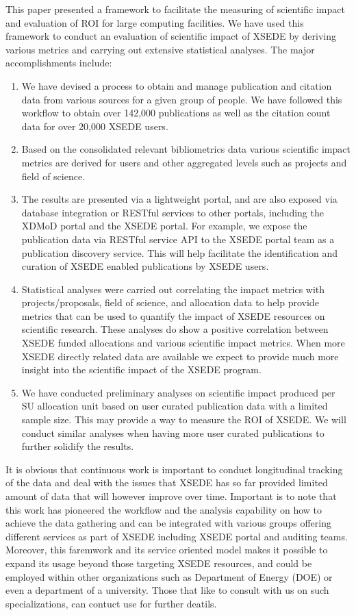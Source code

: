 \documentclass{sig-alternate}
\begin{document}
This paper presented a framework to facilitate the measuring of scientific impact and evaluation of ROI for large computing facilities. We have used this framework to conduct an evaluation of scientific impact of XSEDE by deriving various metrics and carrying out extensive statistical analyses. The major accomplishments include:
\begin{enumerate}
\item We have devised a process to obtain and manage publication and citation data from various sources for a given group of people. We have followed this workflow to obtain over 142,000 publications as well as the citation count data for over 20,000 XSEDE users.
\item Based on the consolidated relevant bibliometrics data various scientific impact metrics are derived for users and other aggregated levels such as projects and field of science.
\item The results are presented via a lightweight portal, and are also exposed via database integration or RESTful services to other portals, including the XDMoD portal and the XSEDE portal. For example, we expose the publication data via RESTful service API to the XSEDE portal team as a publication discovery service. This will help facilitate the identification and curation of XSEDE enabled publications by XSEDE users.
\item Statistical analyses were carried out correlating the impact metrics with projects/proposals, field of science, and allocation data to help provide metrics that can be used to quantify the impact of XSEDE resources on scientific research. These analyses do show a positive correlation between XSEDE funded allocations and various scientific impact metrics. When more XSEDE directly related data are available we expect to provide much more insight into the scientific impact of the XSEDE program.
\item We have conducted preliminary analyses on scientific impact produced per SU allocation unit based on user curated publication data with a limited sample size. This may provide a way to measure the ROI of XSEDE. We will conduct similar analyses when having more user curated publications to further solidify the results.

\end{enumerate} 

It is obvious that continuous work is important to conduct longitudinal tracking of the data and deal with the issues that XSEDE has so far provided limited amount of data that will however improve over time. Important is to note that this work has pioneered the workflow and the analysis capability on how to achieve the data gathering and can be integrated with various groups offering different services as part of XSEDE including XSEDE portal and auditing teams. Moreover, this faremwork and its service oriented model makes it possible to expand its usage beyond those targeting XSEDE resources, and could be employed within other organizations such as Department of Energy (DOE) or even a department of a university. Those that like to consult with us on such specializations, can contuct use for further deatils. 
\end{document}
